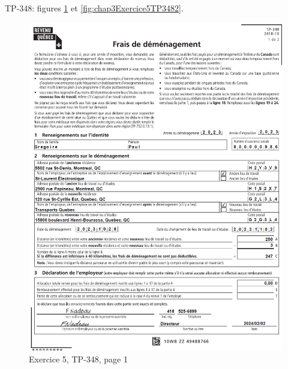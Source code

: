 TP-348: figures \ref{fig:chap3Exercice5TP3481} et \ref{fig:chap3Exercice5TP3482}.
\begin{figure}
	\centering
	\includegraphics[width=.9\textwidth]{exercice/3-5/Q5/TP-348-p1.png}
	\caption{Exercice 5, TP-348, page 1}
	\label{fig:chap3Exercice5TP3481}
\end{figure}
